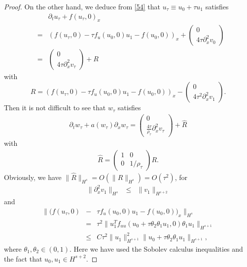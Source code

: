 \documentclass{article}
\theoremstyle{plain}
\begin{document}
\begin{proof}
On the other hand, we deduce from \eqref{54} that $u_\tau \equiv u_0 +\tau u_1$ satisfies
\begin{eqnarray*}
  &&\partial_t u_\tau + f(u_\tau,0)_x \nonumber \\
  &=&  (f(u_\tau,0) - \tau f_u(u_0,0)u_1 - f(u_0,0))_x + \left( \begin{array}{c} 0 \\ 4 \tau \partial^2_x v_0 \end{array} \right) \nonumber \\
	&=& \left( \begin{array}{c} 0 \\ 4 \tau \partial^2_x v_\tau \end{array} \right)   + R
\end{eqnarray*}
with
$$
R=(f(u_\tau,0) - \tau f_u(u_0,0)u_1 - f(u_0,0))_x -\left( \begin{array}{c} 0 \\ 4 \tau^2 \partial^2_x v_1 \end{array} \right).
$$
Then it is not difficult to see that $w_\tau$ satisfies
\begin{eqnarray}\label{58}
  \partial_t w_\tau + a(w_\tau) \partial_x w_\tau = \left( \begin{array}{cc} 0 \\ \frac{4 \tau}{\rho_\tau} \partial^2_x v_\tau \end{array} \right) + \hat R
\end{eqnarray}
with
\begin{eqnarray*}
\hat{R} = \left( \begin{array}{cc} 1 & 0 \\ 0 & 1/\rho_\tau \end{array} \right)R .
\end{eqnarray*}
Obviously, we have $\|\hat{R}\|_{H^s} =O(\|R\|_{H^s})= O(\tau^2)$, for
\begin{eqnarray*}
  \|\partial^2_x v_1 \|_{H^s} &\le&  \|v_1\|_{H^{s+2}}
\end{eqnarray*}
and
\begin{eqnarray*}
  \|(f(u_\tau,0) &-& \tau f_u(u_0,0)u_1 - f(u_0,0))_x\|_{H^s} \\
  &=& \tau^2 \| u_1^Tf_{uu}(u_0+\tau \theta_2 \theta_1  u_1,0) \theta_1 u_1\|_{H^{s+1}} \\
  &\le&  C \tau^2 \|u_1\|_{H^{s+1}}^2 \|u_0+\tau \theta_2 \theta_1  u_1\|_{H^{s+1}},
\end{eqnarray*}
where $\theta_1,\theta_2 \in (0,1)$. Here we have used the Sobolev calculus inequalities \cite{majda1984compressible} and the fact that $u_0, u_1 \in H^{s+2}$.


\end{proof}
\end{document}
